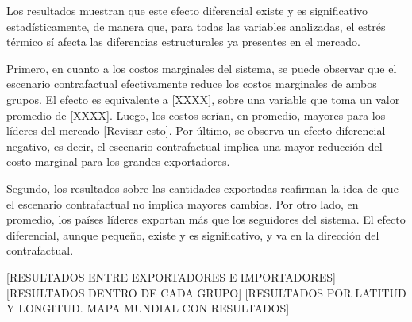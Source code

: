 Los resultados muestran que este efecto diferencial existe y es significativo estadísticamente, de manera que, para todas las variables analizadas, el estrés térmico sí afecta las diferencias estructurales ya presentes en el mercado. 

Primero, en cuanto a los costos marginales del sistema, se puede observar que el escenario contrafactual efectivamente reduce los costos marginales de ambos grupos. El efecto es equivalente a [XXXX], sobre una variable que toma un valor promedio de [XXXX]. Luego, los costos serían, en promedio, mayores para los líderes del mercado [Revisar esto]. Por último, se observa un efecto diferencial negativo, es decir, el escenario contrafactual implica una mayor reducción del costo marginal para los grandes exportadores.

Segundo, los resultados sobre las cantidades exportadas reafirman la idea de que el escenario contrafactual no implica mayores cambios. Por otro lado, en promedio, los países líderes exportan más que los seguidores del sistema. El efecto diferencial, aunque pequeño, existe y es significativo, y va en la dirección del contrafactual.



[RESULTADOS ENTRE EXPORTADORES E IMPORTADORES]
[RESULTADOS DENTRO DE CADA GRUPO]
[RESULTADOS POR LATITUD Y LONGITUD. MAPA MUNDIAL CON RESULTADOS]